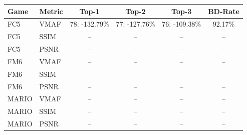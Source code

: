 \begin{tabular}{llcccc}
\toprule
Game & Metric & Top-1 & Top-2 & Top-3 & BD-Rate \\
\midrule
FC5 & VMAF & 78: -132.79\% & 77: -127.76\% & 76: -109.38\% & 92.17\% \\
FC5 & SSIM & -- & -- & -- & -- \\
FC5 & PSNR & -- & -- & -- & -- \\
\midrule
FM6 & VMAF & -- & -- & -- & -- \\
FM6 & SSIM & -- & -- & -- & -- \\
FM6 & PSNR & -- & -- & -- & -- \\
\midrule
MARIO & VMAF & -- & -- & -- & -- \\
MARIO & SSIM & -- & -- & -- & -- \\
MARIO & PSNR & -- & -- & -- & -- \\
\bottomrule
\end{tabular}
